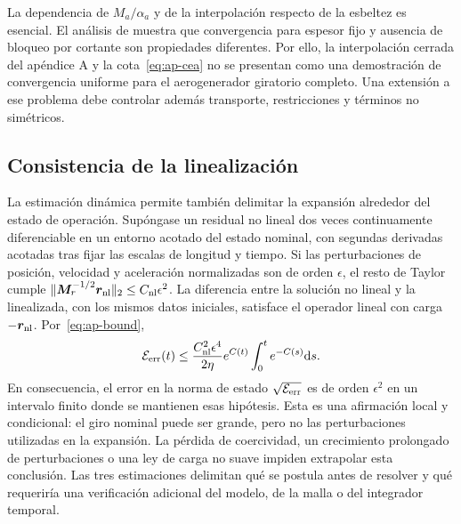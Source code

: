 La dependencia de $M_a/\alpha_a$ y de la interpolación respecto de la esbeltez es esencial. El análisis de \citet{arnold1981} muestra que convergencia para espesor fijo y ausencia de bloqueo por cortante son propiedades diferentes. Por ello, la interpolación cerrada del apéndice A y la cota~\eqref{eq:ap-cea} no se presentan como una demostración de convergencia uniforme para el aerogenerador giratorio completo. Una extensión a ese problema debe controlar además transporte, restricciones y términos no simétricos.

\subsection{Consistencia de la linealización}
La estimación dinámica permite también delimitar la expansión alrededor del estado de operación. Supóngase un residual no lineal dos veces continuamente diferenciable en un entorno acotado del estado nominal, con segundas derivadas acotadas tras fijar las escalas de longitud y tiempo. Si las perturbaciones de posición, velocidad y aceleración normalizadas son de orden $\epsilon$, el resto de Taylor cumple $\|\bm M_r^{-1/2}\bm r_{\rm nl}\|_2\le C_{\rm nl}\epsilon^2$. La diferencia entre la solución no lineal y la linealizada, con los mismos datos iniciales, satisface el operador lineal con carga $-\bm r_{\rm nl}$. Por~\eqref{eq:ap-bound},
\begin{equation}
\mathcal E_{\rm err}(t)\le
\frac{C_{\rm nl}^2\epsilon^4}{2\eta}
 e^{C(t)}\int_0^t e^{-C(s)}\mathrm d s.
\label{eq:ap-linearization}
\end{equation}
En consecuencia, el error en la norma de estado $\sqrt{\mathcal E_{\rm err}}$ es de orden $\epsilon^2$ en un intervalo finito donde se mantienen esas hipótesis. Esta es una afirmación local y condicional: el giro nominal puede ser grande, pero no las perturbaciones utilizadas en la expansión. La pérdida de coercividad, un crecimiento prolongado de perturbaciones o una ley de carga no suave impiden extrapolar esta conclusión. Las tres estimaciones delimitan qué se postula antes de resolver y qué requeriría una verificación adicional del modelo, de la malla o del integrador temporal.
